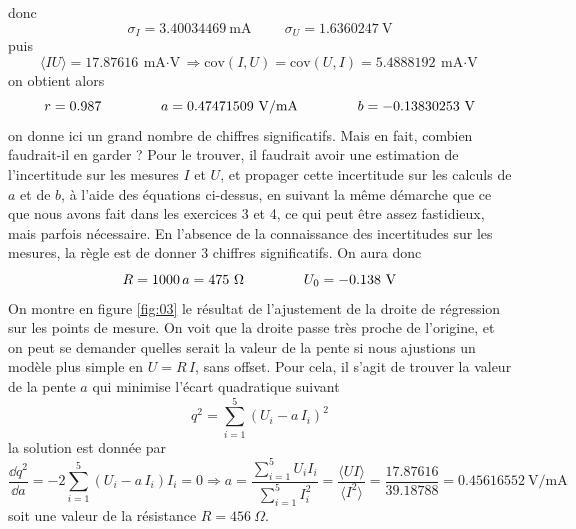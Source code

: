 donc
$$
\sigma_I=3.40034469\ \text{mA}\hspace{1cm}\sigma_U=1.6360247\ \text{V}
$$
puis
$$
\langle IU \rangle=17.87616\ \text{mA$\cdot$V}\Longrightarrow\text{cov}(I,U)=\text{cov}(U,I)=
5.4888192\ \text{mA$\cdot$V}
$$
on obtient alors
$$
r=0.987\hspace{1.5cm}a=0.47471509\ \text{V/mA}\hspace{1.5cm}b=-0.13830253\ \text{V}
$$
on donne ici un grand nombre de chiffres significatifs. Mais en fait, combien faudrait-il en garder ? Pour le trouver, il faudrait avoir une estimation de l'incertitude sur les mesures $I$ et $U$, et propager cette incertitude sur les calculs de $a$ et de $b$, à l'aide des équations ci-dessus, en suivant la même démarche que ce que nous avons fait dans les exercices 3 et 4, ce qui peut être assez fastidieux, mais parfois nécessaire. En l'absence de la connaissance des incertitudes sur les mesures, la règle est de donner 3 chiffres significatifs. On aura donc
$$
R=1000\,a=475\ \Omega\hspace{1.5cm}U_0=-0.138\ \text{V}
$$
On montre en figure \ref{fig:03} le résultat de l'ajustement de la droite de régression sur les points de mesure. On voit que la droite passe très proche de l'origine, et on peut se demander quelles serait la valeur de la pente si nous ajustions un modèle plus simple en $U=R\,I$, sans offset. Pour cela, il s'agit de trouver la valeur de la pente $a$ qui minimise l'écart quadratique suivant
$$
q^2=\sum\limits_{i=1}^{5}(U_i-a\,I_i)^2
$$
la solution est donnée par
$$
\frac{\dd q^2}{\dd a}=-2\sum\limits_{i=1}^{5}(U_i-a\,I_i)I_i=0
\Longrightarrow a=\frac{\sum\limits_{i=1}^{5}U_iI_i}{\sum\limits_{i=1}^{5}I_i^2}=
\frac{\langle UI\rangle}{\langle I^2\rangle}=\frac{17.87616}{39.18788}=0.45616552\ \text{V/mA}
$$
soit une valeur de la résistance $R=456\ \Omega$.

